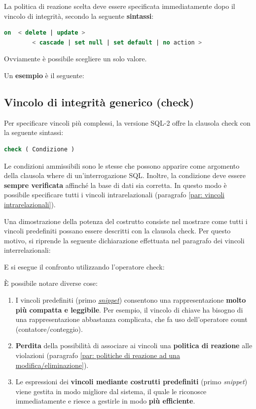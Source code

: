 \documentclass[a4paper]{article}
\begin{document}
	\noindent
	La politica di reazione scelta deve essere specificata immediatamente dopo il vincolo di integrità, secondo la seguente \textbf{sintassi}:
\begin{lstlisting}[language=SQL]
on 	< delete | update >
		< cascade | set null | set default | no action >\end{lstlisting}
	Ovviamente è possibile scegliere un solo valore.\newline
	
	\noindent
	Un \textcolor{Green4}{\textbf{esempio}} è il seguente:
	\newpage

	\subsection{Vincolo di integrità generico (\textsf{check})}

	Per specificare vincoli più complessi, la versione SQL-2 offre la clausola \textsf{check} con la seguente sintassi:
\begin{lstlisting}[language=SQL]
check ( Condizione )
\end{lstlisting}
	Le condizioni ammissibili sono le stesse che possono apparire come argomento della clausola \textsf{where} di un'interrogazione SQL. Inoltre, la condizione deve essere \textbf{sempre verificata} affinché la base di dati sia corretta. In questo modo è possibile specificare tutti i vincoli intrarelazionali (paragrafo \ref{par: vincoli intrarelazionali}).\newline
	
	\noindent
	Una dimostrazione della potenza del costrutto consiste nel mostrare come tutti i vincoli predefiniti possano essere descritti con la clausola \textsf{check}. Per questo motivo, si riprende la seguente dichiarazione effettuata nel paragrafo dei vincoli interrelazionali:
	
	E si esegue il confronto utilizzando l'operatore \textsf{check}:
	
	È possibile notare diverse cose:
	\begin{enumerate}
		\item I vincoli predefiniti (primo \href{https://it.wikipedia.org/wiki/Snippet}{\emph{snippet}}) consentono una rappresentazione \textbf{molto più compatta e leggibile}. Per esempio, il vincolo di chiave ha bisogno di una rappresentazione abbastanza complicata, che fa uso dell'operatore \textsf{count} (contatore/conteggio).
		
		\item \textbf{Perdita} della possibilità di associare ai vincoli una \textbf{politica di reazione} alle violazioni (paragrafo \ref{par: politiche di reazione ad una modifica/eliminazione}).
		
		\item Le espressioni dei \textbf{vincoli mediante costrutti predefiniti} (primo \emph{snippet}) viene gestita in modo migliore dal sistema, il quale le riconosce immediatamente e riesce a gestirle in modo \textbf{più efficiente}.
	\end{enumerate}\newpage
\end{document}
